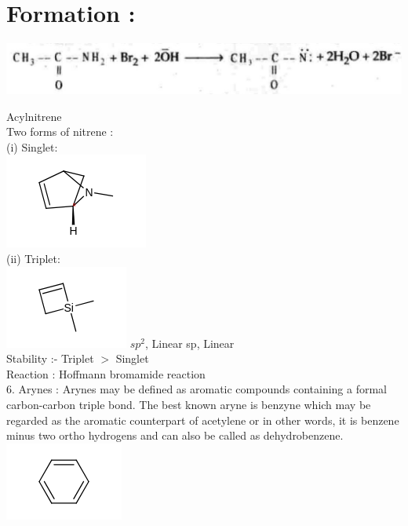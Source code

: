 \documentclass[10pt]{article}
\begin{document}
\section*{Formation :}
\begin{center}
\includegraphics[max width=\textwidth]{2025_01_28_8470952b98110cec3aabg-089(3)}
\end{center}

Acylnitrene\\
Two forms of nitrene :\\
(i) Singlet:\\
\includegraphics{smile-792b1b66e1f275ebcd743a3351339a9fa6a0399b}\\
(ii) Triplet:\\
\includegraphics{smile-378fa7b78fed38913daffcdc2deffa67a34f2195} $s p^{2}$, Linear sp, Linear\\
Stability :- Triplet $>$ Singlet\\
Reaction : Hoffmann bromamide reaction\\
6. Arynes : Arynes may be defined as aromatic compounds containing a formal carbon-carbon triple bond. The best known aryne is benzyne which may be regarded as the aromatic counterpart of acetylene or in other words, it is benzene minus two ortho hydrogens and can also be called as dehydrobenzene.\\
\includegraphics{smile-d46a3e7f5ea7ac85eea26c943a7fca2c9d286b1d}
\end{document}
